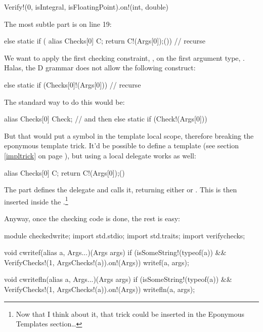 \begin{dcode}
Verify!(0, isIntegral, isFloatingPoint).on!(int, double)
\end{dcode}

The most subtle part is on line 19: 

\begin{dcode}
else static if ({ alias Checks[0] C; return C!(Args[0]);}()) // recurse
\end{dcode}

We want to apply the first checking constraint, , on the first argument type, . Halas, the D grammar does not allow the following construct:

\begin{dcode}
else static if (Checks[0]!(Args[0])) // recurse
\end{dcode}

The standard way to do this would be:

\begin{dcode}
alias Checks[0] Check;
// and then
else static if (Check!(Args[0]))
\end{dcode}

But that would put a  symbol in the template local scope, therefore breaking the eponymous template trick. It'd be possible to define a  template (see section \ref{impltrick} on page \pageref{impltrick}), but using a local delegate works as well:

\begin{dcode}
{ alias Checks[0] C; return C!(Args[0]);}()
\end{dcode}

The  part defines the delegate and \DD{()} calls it, returning either  or . This is then inserted inside the .\footnote{ Now that I think about it, that trick could be inserted in the Eponymous Templates section\ldots}

Anyway, once the checking code is done, the rest is easy:

\begin{dcode}
module checkedwrite;
import std.stdio;
import std.traits;
import verifychecks;

void cwritef(alias a, Args...)(Args args) 
if (isSomeString!(typeof(a))
 && VerifyChecks!(1, ArgsChecks!(a)).on!(Args))
{
    writef(a, args);
}

void cwritefln(alias a, Args...)(Args args)
if (isSomeString!(typeof(a))
 && VerifyChecks!(1, ArgsChecks!(a)).on!(Args))
{
    writefln(a, args);
}
\end{dcode}

